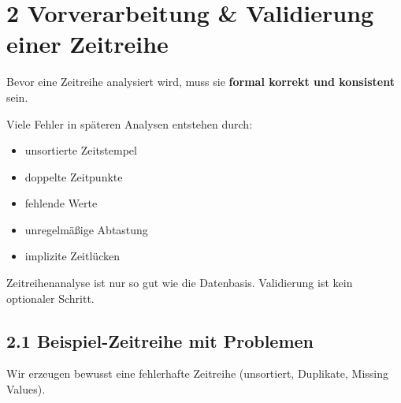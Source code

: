 \documentclass[
  ngerman,
  letterpaper,
  DIV=11]{scrreprt}
\providecommand{\tightlist}{%
  \setlength{\itemsep}{0pt}\setlength{\parskip}{0pt}}
\begin{document}

\chapter{2 Vorverarbeitung \& Validierung einer
Zeitreihe}\label{vorverarbeitung-validierung-einer-zeitreihe-1}

Bevor eine Zeitreihe analysiert wird, muss sie \textbf{formal korrekt
und konsistent} sein.

Viele Fehler in späteren Analysen entstehen durch:

\begin{itemize}
\tightlist
\item
  unsortierte Zeitstempel
\item
  doppelte Zeitpunkte
\item
  fehlende Werte
\item
  unregelmäßige Abtastung
\item
  implizite Zeitlücken
\end{itemize}

\begin{tcolorbox}[enhanced jigsaw, titlerule=0mm, title=\textcolor{quarto-callout-note-color}{\faInfo}\hspace{0.5em}{Merke}, bottomrule=.15mm, opacityback=0, colbacktitle=quarto-callout-note-color!10!white, coltitle=black, opacitybacktitle=0.6, colframe=quarto-callout-note-color-frame, toprule=.15mm, leftrule=.75mm, arc=.35mm, rightrule=.15mm, breakable, bottomtitle=1mm, colback=white, toptitle=1mm, left=2mm]

Zeitreihenanalyse ist nur so gut wie die Datenbasis. Validierung ist
kein optionaler Schritt.

\end{tcolorbox}

\section{2.1 Beispiel-Zeitreihe mit
Problemen}\label{beispiel-zeitreihe-mit-problemen}

Wir erzeugen bewusst eine fehlerhafte Zeitreihe (unsortiert, Duplikate,
Missing Values).
\end{document}
